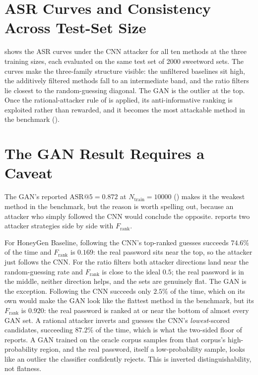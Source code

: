 \section{ASR Curves and Consistency Across Test-Set Size}
\label{sec:results-testsize}

 shows the ASR curves under the CNN attacker for all
ten methods at the three training sizes, each evaluated on the same test
set of 2000 sweetword sets. The curves make the three-family structure
visible: the unfiltered baselines sit high, the additively filtered
methods fall to an intermediate band, and the ratio filters lie closest
to the random-guessing diagonal. The GAN is the outlier at the top. Once
the rational-attacker rule of  is applied, its
anti-informative ranking is exploited rather than rewarded, and it
becomes the most attackable method in the benchmark
().



\section{The GAN Result Requires a Caveat}
\label{sec:results-gan}



The GAN's reported $\mathrm{ASR}@5 = 0.872$ at $N_{\text{train}} = 10000$
() makes it the weakest method in the benchmark,
but the reason is worth spelling out, because an attacker who simply
followed the CNN would conclude the opposite.  reports two
attacker strategies side by side with $F_{\text{rank}}$.



For HoneyGen Baseline, following the CNN's top-ranked guesses succeeds
$74.6\%$ of the time and $F_{\text{rank}}$ is $0.169$: the real password
sits near the top, so the attacker just follows the CNN. For the ratio
filters both attacker directions land near the random-guessing rate and
$F_{\text{rank}}$ is close to the ideal $0.5$; the real password is in
the middle, neither direction helps, and the sets are genuinely flat.
The GAN is the exception. Following the CNN succeeds only $2.5\%$ of the
time, which on its own would make the GAN look like the flattest method
in the benchmark, but its $F_{\text{rank}}$ is $0.920$: the real
password is ranked at or near the bottom of almost every GAN set. A
rational attacker inverts and guesses the CNN's \emph{lowest}-scored
candidates, succeeding $87.2\%$ of the time, which is what the two-sided
floor of  reports. A GAN trained on the oracle corpus
samples from that corpus's high-probability region, and the real
password, itself a low-probability sample, looks like an outlier the
classifier confidently rejects. This is inverted distinguishability, not
flatness.

